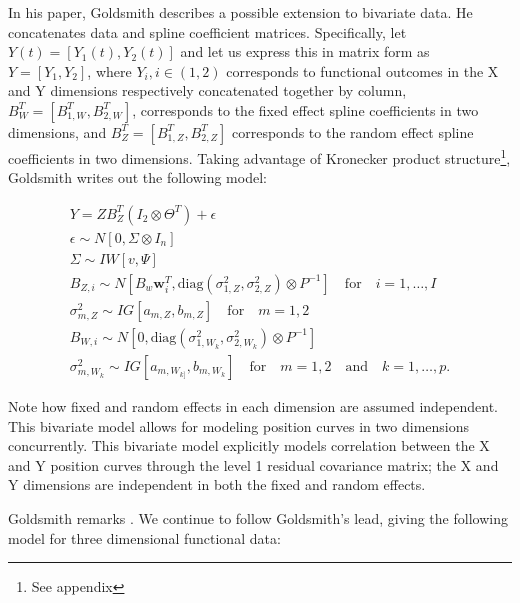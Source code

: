 In his paper, Goldsmith describes a possible extension to bivariate data.  
He concatenates data and spline coefficient matrices.  
Specifically, let \(Y(t) = \left[Y_1(t),Y_2(t)\right]\) and let us express this in matrix form as \(Y = [Y_1,Y_2]\), 
where \(Y_i, i\in(1,2)\) corresponds to functional outcomes in the X and Y dimensions respectively concatenated together by 
column, \(B_W^T = [B_{1,W}^T, B_{2,W}^T]\), corresponds to the fixed effect spline coefficients in two dimensions, 
and \(B_Z^T = [B_{1,Z}^T, B_{2,Z}^T]\) corresponds to the random effect spline coefficients in two dimensions.  
Taking advantage of Kronecker product structure\footnote{See appendix},  Goldsmith writes out the following model:

\begin{equation}
    \begin{split}
        Y = ZB_Z^T\left(I_2 \otimes\Theta^T\right) + \epsilon\\
        \epsilon\sim N[0, \Sigma\otimes I_n]\\
        \Sigma \sim IW[v, \Psi]\\
        B_{Z,i} \sim N[B_w \boldsymbol{w}_i^T, \text{diag}\left(\sigma_{1,Z}^2, \sigma_{2,Z}^2\right)\otimes P^{-1}]\quad \text{for} \quad i = 1,\dots, I\\
        \sigma_{m,Z}^2 \sim IG[a_{m,Z}, b_{m,Z}]\quad \text{for} \quad m = 1,2\\
        B_{W,i} \sim N[0, \text{diag}\left(\sigma_{1,W_{k}}^2, \sigma_{2,W_{k}}^2\right)\otimes P^{-1}]\\
        \sigma_{m,W_{k}}^2 \sim IG[a_{m,W_{k]}}, b_{m,W_{k}}]\quad \text{for} \quad m = 1,2 \quad\text{and} \quad k = 1,\dots, p.
    \end{split}
\end{equation}

Note how fixed and random effects in each dimension are assumed independent.  
This bivariate model allows for modeling position curves in two dimensions concurrently.  
This bivariate model explicitly models correlation between the X and Y position curves through the level 1 residual 
covariance matrix; the X and Y dimensions are independent in both the fixed and random effects.      

Goldsmith remarks .  
We continue to follow Goldsmith's lead, giving the following model for three dimensional functional data:

